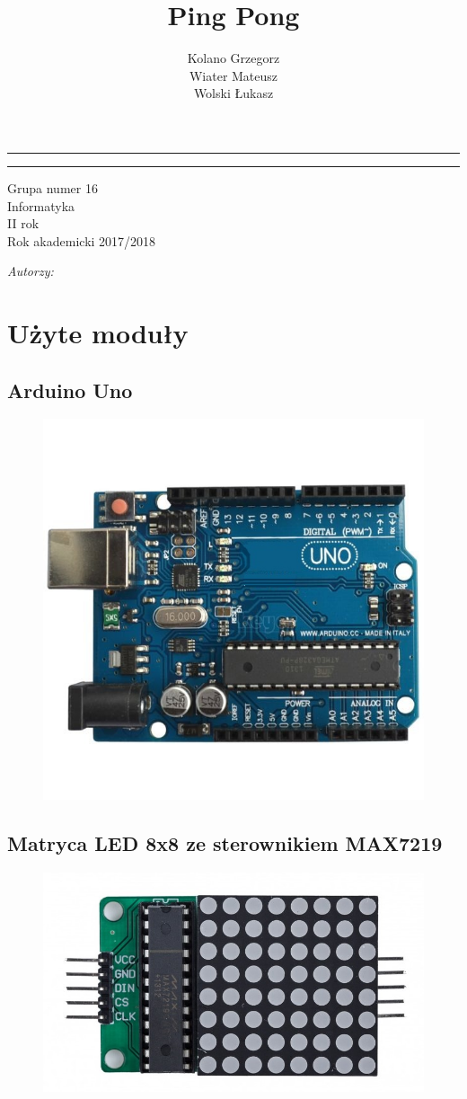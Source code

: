 \documentclass[12pt,notitlepage]{article}
\author{Kolano Grzegorz\\
	Wiater Mateusz\\
	Wolski Łukasz\\
}
\title{Ping Pong}
\makeatletter
\newcommand{\linia}{\rule{\linewidth}{0.4mm}}
\renewcommand{\maketitle}{\begin{titlepage}



    \noindent\linia

    \begin{center}

      \LARGE \textsc{\@title}

         \end{center}

     \linia

    \vspace{0.5cm}
    
        \vspace*{1cm}

    \begin{center}\Large

    Grupa numer 16\\

Informatyka\\
II rok\\
Rok akademicki 2017/2018\\

    \end{center}

    \vspace{3cm}


	\begin{center}
	
    \begin{minipage}{6cm}
\begin{center}

    \textit{\normalsize Autorzy:}\\

\end{center}
    \Large \textsc{\@author} \par

    \end{minipage}

	\end{center}
    \vspace{5cm}




    \vspace*{\stretch{6}}

    \begin{center}

    \@date

    \end{center}

  \end{titlepage}%

}
\makeatother
\begin{document}
\maketitle

\newpage

\section{Użyte moduły}
\subsection{Arduino Uno}
\begin{figure}[h!]
  \includegraphics[width=\textwidth]{uno.jpg}
  \label{fig:uno}
\end{figure}
\newpage
\subsection{Matryca LED 8x8 ze sterownikiem MAX7219}
\begin{figure}[h!]
  \includegraphics[width=\textwidth]{matrix.jpg}
  \label{fig:matrix}
\end{figure}
\end{document}
